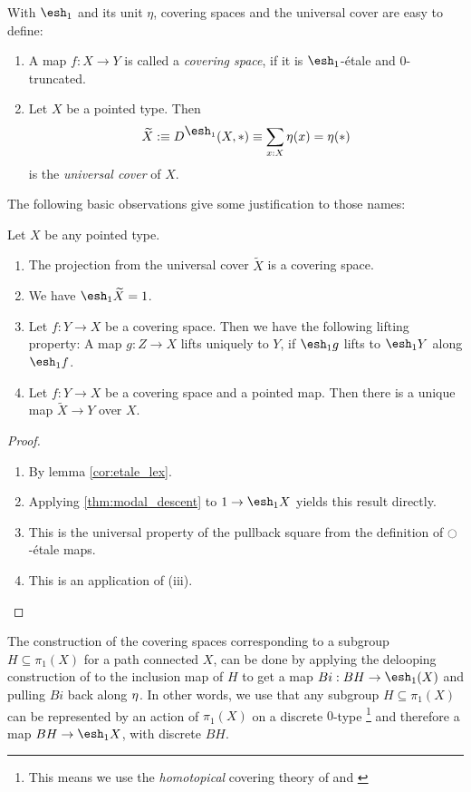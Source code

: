 \documentclass[9pt,twosided]{amsart}
\newcommand{\shape}{\ensuremath{\mathord{\raisebox{0.5pt}{\text{\rm\esh}}}}}
\begin{document}
With $\shape_1$ and its unit $\eta$, covering spaces and the universal cover are easy to define:
\begin{defn}
  \begin{enumerate}
  \item A map $f:X\to Y$ is called a \emph{covering space}, if it is $\shape_1$-étale and $0$-truncated.
  \item Let $X$ be a pointed type. Then
    \[ \widetilde{X}:\equiv D^{\shape_1}(X,\ast)\equiv\sum_{x:X}\modalunit(x)=\modalunit(\ast) \]
    is the \emph{universal cover} of $X$.
  \end{enumerate}

\end{defn}
The following basic observations give some justification to those names:
\begin{rmk}
  Let $X$ be any pointed type.
  \begin{enumerate}
  \item The projection from the universal cover $\widetilde{X}$ is a covering space.
  \item We have $\shape_1 \widetilde{X} = 1$.
  \item Let $f:Y\to X$ be a covering space. Then we have the following lifting property:
    A map $g:Z\to X$ lifts uniquely to $Y$, if $\shape_1 g$ lifts to $\shape_1 Y$ along $\shape_1 f$.
  \item Let $f:Y\to X$ be a covering space and a pointed map. Then there is a unique map $\widetilde{X}\to Y$ over $X$.
  \end{enumerate}
\end{rmk}
\begin{proof}
  \begin{enumerate}
  \item By lemma \ref{cor:etale_lex}. 
  \item Applying \ref{thm:modal_descent} to $1\to \shape_1 X$ yields this result directly.
  \item This is the universal property of the pullback square from the definition of ${\ocircle}$-étale maps.
  \item This is an application of (iii).
  \end{enumerate}
\end{proof}

The construction of the covering spaces corresponding to a subgroup $H\subseteq \pi_1(X)$ for a path connected $X$,
can be done by applying the delooping construction of \cite{LicataFinster} to the inclusion map of $H$ to get a map $Bi:BH\to\shape_1(X)$ and pulling $Bi$ back along ${\eta_{}}$. In other words, we use that any subgroup $H\subseteq\pi_1(X)$ can be represented by an action of $\pi_1(X)$ on a discrete $0$-type
\footnote{This means we use the \emph{homotopical} covering theory of \cite[Section 3.1]{favonia-thesis} 
and \cite[Section 7.1]{ulrik-egbert-floris-groups}}
and therefore a map $BH\to \shape_1X$, with discrete $BH$.
\end{document}
